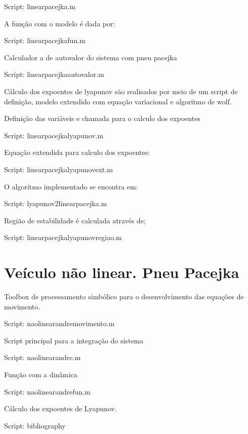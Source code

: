 \documentclass[sublist]{fei}
\begin{document}
	Script: linearpacejka.m

A função com o modelo é dada por:

	Script: linearpacejkafun.m

Calculador a de autovalor do sistema com pneu pacejka

	Script: linearpacejkaautovalor.m

Cálculo dos expoentes de lyapunov são realisados por meio de um script de definição, modelo extendido com equação variacional e algoritmo de wolf.

Definição das variáveis e chamada para o calculo dos expoentes

	Script: linearpacejkalyapunov.m

Equação extendida para calculo dos expoentes:

	Script: linearpacejkalyapunovext.m

O algoritmo implementado se encontra em:

Script: lyapunov2linearpacejka.m

Região de estabilidade é calculada através de;

	Script: linearpacejkalyapunovregiao.m








\chapter{Veículo não linear. Pneu Pacejka} 

Toolbox de processamento simbólico para o desenvolvimento das equações de movimento.

	Script: naolinearandremovimento.m

Script principal para a integração do sistema

	Script: naolinearandre.m

Função com a dinâmica

	Script: naolinearandrefun.m

Cálculo dos expoentes de Lyapunov.

	Script: bibliography






%

\end{document}

